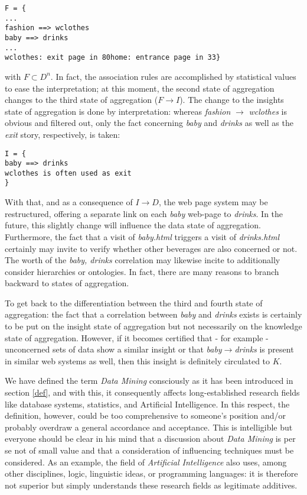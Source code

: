 \documentclass[10pt,latex8]{article}
\begin{document}
{\small
\begin{verbatim}
F = {
...
fashion ==> wclothes
baby ==> drinks
...
wclothes: exit page in 80home: entrance page in 33}
\end{verbatim}
}
with $F\subset D^n$. In fact, the association rules are accomplished by statistical values to ease the interpretation; at this moment, the second state of aggregation changes to the third state of aggregation ($F\rightarrow I$). The change to the insights state of aggregation is done by interpretation: whereas \textit{fashion} $\rightarrow$ \textit{wclothes} is obvious and filtered out, only the fact concerning \textit{baby} and \textit{drinks} as well as the \textit{exit} story, respectively, is taken:

{\small
\begin{verbatim}
I = {
baby ==> drinks
wclothes is often used as exit 
}
\end{verbatim}
}
With that, and as a consequence of $I\rightarrow D$, the web page system may be restructured, offering a separate link on each \textit{baby} web-page to \textit{drinks}. In the future, this slightly change will influence the data state of aggregation. Furthermore, the fact that a visit of \textit{baby.html} triggers a visit of \textit{drinks.html} certainly may invite to verify whether other beverages are also concerned or not. The worth of the \textit{baby, drinks} correlation may likewise incite to additionally consider hierarchies or ontologies. In fact, there are many reasons to branch backward to states of aggregation.

To get back to the differentiation between the third and fourth state of aggregation: the fact that a correlation between \textit{baby} and \textit{drinks} exists is certainly to be put on the insight state of aggregation but not necessarily on the knowledge state of aggregation. However, if it becomes certified that - for example - unconcerned sets of data show a similar insight or that \textit{baby}$\rightarrow$\textit{drinks} is present in similar web systems as well, then this insight is definitely circulated to $K$.

We have defined the term \textit{Data Mining} consciously as it has been introduced in section \ref{def}, and with this, it consequently affects long-established research fields like database systems, statistics, and Artificial Intelligence. In this respect, the definition, however, could be too comprehensive to someone's position and/or probably overdraw a general accordance and acceptance. This is intelligible but everyone should be clear in his mind that a discussion about \textit{Data Mining} is per se not of small value and that a consideration of influencing techniques must be considered. As an example, the field of \textit{Artificial Intelligence} also uses, among other disciplines, logic, linguistic ideas, or programming languages: it is therefore not superior but simply understands these research fields as legitimate additives.
\end{document}
